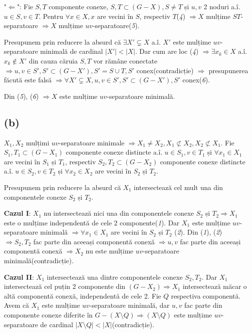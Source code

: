 \documentclass[a4paper,12pt]{article}
\begin{document}
"$\Leftarrow$": Fie $S,T$ componente conexe, $S,T \subset (G-X), S \neq T$ și $u,v$ 2 noduri a.î. $u \in S, v \in T$. Pentru $\forall x \in X, x$ are vecini în $S$, respectiv $T$({\itshape4}) $\Rightarrow X$ mulțime $ST$-separatoare $\Rightarrow X$ mulțime $uv$-separatoare({\itshape5}).

Presupunem prin reducere la absurd că $\exists X' \subsetneq X$ a.î. $X'$ este mulțime $uv$-separatoare minimală de cardinal $|X'| < |X|$. Dar cum are loc ({\itshape4}) $\Rightarrow \exists x_k \in X$ a.î. $x_k \notin X'$ din cauza căruia $S,T$ vor rămâne conectate $\Rightarrow u,v \in S', S' \subset (G-X'), S' = S \cup T, S'$ conex(contradicție) $\Rightarrow$ presupunerea făcută este falsă $\Rightarrow \forall X' \subsetneq X, u,v \in S', S' \subset (G-X'), S'$ conex({\itshape6}).

Din ({\itshape5}), ({\itshape6}) $\Rightarrow X$ este mulțime $uv$-separatoare minimală.

\subsection{(b)}

$X_1,X_2$ mulțimi $uv$-separatoare minimale $\Rightarrow X_1 \neq X_2, X_1 \not \subset X_2, X_2 \not \subset X_1$. Fie $S_1,T_1 \subset (G-X_1)$ componente conexe distincte a.î. $u \in S_1, v \in T_1$ și $\forall x_1 \in X_1$ are vecini în $S_1$ și $T_1$, respectiv $S_2,T_2 \subset (G-X_2)$ componente conexe distincte a.î. $u \in S_2, v \in T_2$ și $\forall x_2 \in X_2$ are vecini în $S_2$ și $T_2$.

Presupunem prin reducere la absurd că $X_1$ intersectează cel mult una din componentele conexe $S_2$ și $T_2$.

\textbf{Cazul I}: $X_1$ nu intersectează nici una din componentele conexe $S_2$ și $T_2 \Rightarrow X_1$ este o mulțime independentă de cele 2 componente({\itshape1}). Dar $X_1$ este mulțime $uv$-separatoare minimală $\Rightarrow \forall x_1 \in X_1$ are vecini în $S_2$ și $T_2$ ({\itshape2}). Din ({\itshape1}), ({\itshape2}) $\Rightarrow S_2,T_2$ fac parte din aceeași componentă conexă $\Rightarrow u, v$ fac parte din aceeași componentă conexă $\Rightarrow X_2$ nu este mulțime $uv$-separatoare minimală(contradicție).

\textbf{Cazul II}: $X_1$ intersectează una dintre componentele conexe $S_2, T_2$. Dar $X_1$ intersectează cel puțin 2 componente din $(G-X_2) \Rightarrow X_1$ intersectează măcar o altă componentă conexă, independentă de cele 2. Fie $Q$ respectiva componentă. Avem că $X_1$ este mulțime $uv$-separatoare minimală, dar $u,v$ fac parte din componente conexe diferite în $G - (X \setminus Q) \Rightarrow (X \setminus Q)$ este mulțime $uv$-separatoare de cardinal $|X\setminus Q| < |X|$(contradicție).
\end{document}
